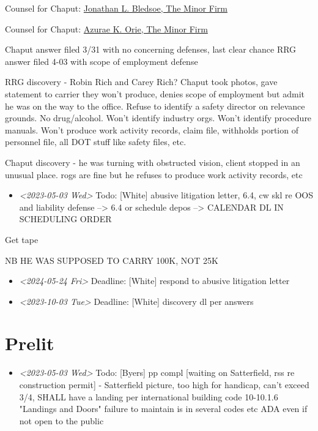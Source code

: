 \documentclass[11pt]{article}
\begin{document}
Counsel for Chaput: \href{https://www.gabar.org/MemberSearchDetail.cfm?ID=MDYzMTQz}{Jonathan L. Bledsoe, The Minor Firm}

Counsel for Chaput: \href{https://www.gabar.org/MemberSearchDetail.cfm?ID=NjQ5Mjky}{Azurae K. Orie, The Minor Firm}

Chaput answer filed 3/31 with no concerning defenses, last clear chance
RRG answer filed 4-03 with scope of employment defense

RRG discovery - Robin Rich and Carey Rich? Chaput took photos, gave statement to carrier they won't produce, denies scope of employment but admit he was on the way to the office. Refuse to identify a safety director on relevance grounds. No drug/alcohol. Won't identify industry orgs. Won't identify procedure manuals. Won't produce work activity records, claim file, withholds portion of personnel file, all DOT stuff like safety files, etc.

Chaput discovery - he was turning with obstructed vision, client stopped in an unusual place. rogs are fine but he refuses to produce work activity records, etc

\begin{itemize}
\item \textit{<2023-05-03 Wed> } Todo: [White] abusive litigation letter, 6.4, cw skl re OOS and liability defense --> 6.4 or schedule depos --> CALENDAR DL IN SCHEDULING ORDER
\end{itemize}

Get tape

NB HE WAS SUPPOSED TO CARRY 100K, NOT 25K

\begin{itemize}
\item \textit{<2024-05-24 Fri> } Deadline: [White] respond to abusive litigation letter

\item \textit{<2023-10-03 Tue> } Deadline: [White] discovery dl per answers
\end{itemize}

\section*{Prelit}
\label{sec:orgad7a9ed}

\begin{itemize}
\item \textit{<2023-05-03 Wed> } Todo: [Byers] pp compl [waiting on Satterfield, rss re construction permit] - Satterfield picture, too high for handicap, can't exceed 3/4, SHALL have a landing per international building code 10-10.1.6 "Landings and Doors" failure to maintain is in several codes etc ADA even if not open to the public
\end{itemize}
\end{document}
